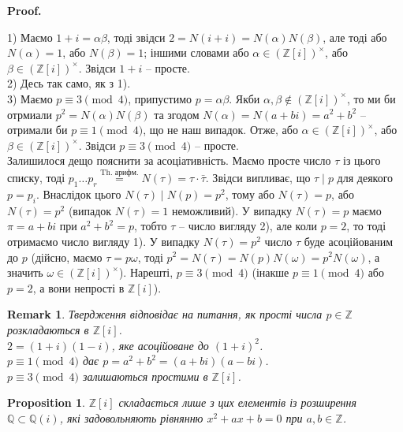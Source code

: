 \documentclass[a4paper, 10pt]{article}
\makeatletter
\theoremstyle{theoremdd}
\theoremstyle{theoremdd}
\theoremstyle{theoremdd}
\theoremstyle{theoremdd}
\theoremstyle{theoremdd}
\theoremstyle{theoremdd}
\theoremstyle{theoremdd}
\theoremstyle{theoremdd}
\theoremstyle{theoremdd}
\newtheorem{proposition}[theorem]{Proposition}
\theoremstyle{theoremdd}
\theoremstyle{theoremdd}
\newtheorem{remark}[theorem]{Remark}
\theoremstyle{theoremdd}
\theoremstyle{theoremdd}
\theoremstyle{theoremdd}
\theoremstyle{theoremdd}
\renewenvironment{proof}[1][Proof.\\]{\par
\pushQED{\hfill \qed}%
\normalfont \topsep6\p@\@plus6\p@\relax
\trivlist
\item\relax
{\bfseries
#1\@addpunct{.}}\hspace\labelsep\ignorespaces
}{%
\popQED\endtrivlist\@endpefalse
}
\makeatother
\begin{document}
\begin{proof}
1) Маємо $1 + i = \alpha \beta$, тоді звідси $2 = N(i+i) = N(\alpha) N(\beta)$, але тоді або $N(\alpha) = 1$, або $N(\beta) = 1$; іншими словами або $\alpha \in (\mathbb{Z}[i])^\times$, або $\beta \in (\mathbb{Z}[i])^\times$. Звідси $1 + i$ -- просте.
\bigskip \\
2) Десь так само, як з 1).
\bigskip \\
3) Маємо $p \equiv 3 \pmod 4$, припустимо $p = \alpha \beta$. Якби $\alpha, \beta \notin (\mathbb{Z}[i])^\times$, то ми би отрмиали $p^2 = N(\alpha) N(\beta)$ та згодом $N(\alpha) = N(a + bi) = a^2 + b^2$ -- отримали би $p \equiv 1 \pmod 4$, що не наш випадок. Отже, або $\alpha \in (\mathbb{Z}[i])^\times$, або $\beta \in (\mathbb{Z}[i])^\times$. Звідси $p \equiv 3 \pmod 4$ -- просте.
\bigskip \\
Залишилося дещо пояснити за асоціативність. Маємо просте число $\tau$ із цього списку, тоді $p_1 \dots p_r \overset{\text{Th. арифм.}}{=} N(\tau) = \tau \cdot \bar{\tau}$. Звідси випливає, що $\tau \mid p$ для деякого $p = p_i$. Внаслідок цього $N(\tau) \mid N(p) = p^2$, тому або $N(\tau) = p$, або $N(\tau) = p^2$ (випадок $N(\tau) = 1$ неможливий). У випадку $N(\tau) = p$ маємо $\pi = a + bi$ при $a^2+b^2 = p$, тобто $\tau$ -- число вигляду 2), але коли $p = 2$, то тоді отримаємо число вигляду 1). У випадку $N(\tau) = p^2$ число $\tau$ буде асоційованим до $p$ (дійсно, маємо $\tau = p \omega$, тоді $p^2 = N(\tau) = N(p) N(\omega) = p^2 N(\omega)$, а значить $\omega \in (\mathbb{Z}[i])^\times$). Нарешті, $p \equiv 3 \pmod 4$ (інакше $p \equiv 1 \pmod 4$ або $p = 2$, а вони непрості в $\mathbb{Z}[i]$).
\end{proof}

\begin{remark}
Твердження відповідає на питання, як прості числа $p \in \mathbb{Z}$ розкладаються в $\mathbb{Z}[i]$.\\
$2 = (1+i)(1-i)$, яке асоційоване до $(1+i)^2$.\\
$p \equiv 1 \pmod 4$ дає $p = a^2 + b^2 = (a+bi)(a-bi)$.\\
$p \equiv 3 \pmod 4$ залишаються простими в $\mathbb{Z}[i]$.
\end{remark}

\begin{proposition}
$\mathbb{Z}[i]$ складається лише з цих елементів із розширення $\mathbb{Q} \subset \mathbb{Q}(i)$, які задовольняють рівнянню $x^2 + ax + b = 0$ при $a,b \in \mathbb{Z}$.
\end{proposition}
\end{document}
